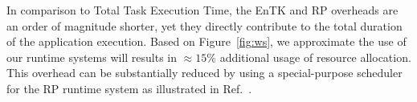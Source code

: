 In comparison to Total Task Execution Time, the EnTK and RP overheads are an
order of magnitude shorter, yet they directly contribute to the total
duration of the application execution. Based on Figure~\ref{fig:ws}, we
approximate the use of our runtime systems will results in $\approx15\%$
additional usage of resource allocation. This overhead can be substantially
reduced by using a special-purpose scheduler for the RP runtime system as
illustrated in Ref.~\cite{merzky2018}.









